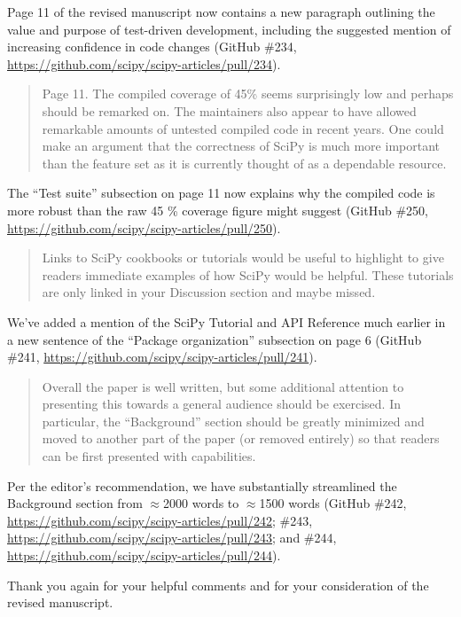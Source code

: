 \documentclass[10pt,stdletter,dateno]{newlfm}
\begin{document}
\begin{newlfm}
Page 11 of the revised manuscript now contains a new paragraph outlining the value and purpose of test-driven development, including the suggested mention of increasing confidence in code changes (GitHub \#234, \url{https://github.com/scipy/scipy-articles/pull/234}). 

\begin{quote}
Page 11. The compiled coverage of 45\% seems surprisingly low and perhaps should be remarked on. The maintainers also appear to have allowed remarkable amounts of untested compiled code in recent years. One could make an argument that the correctness of SciPy is much more important than the feature set as it is currently thought of as a dependable resource.
\end{quote}

The ``Test suite'' subsection on page 11 now explains why the compiled code is more robust than the raw 45 \% coverage figure might suggest (GitHub \#250, \url{https://github.com/scipy/scipy-articles/pull/250}). 

\begin{quote}
Links to SciPy cookbooks or tutorials would be useful to highlight to give readers immediate examples of how SciPy would be helpful. These tutorials are only linked in your Discussion section and maybe missed.
\end{quote}

We've added a mention of the SciPy Tutorial and API Reference much earlier in a new sentence of the ``Package organization'' subsection on page 6 (GitHub \#241, \url{https://github.com/scipy/scipy-articles/pull/241}). 

\begin{quote}
Overall the paper is well written, but some additional attention to presenting this towards a general audience should be exercised. In particular, the “Background” section should be greatly minimized and moved to another part of the paper (or removed entirely) so that readers can be first presented with capabilities.
\end{quote}

Per the editor's recommendation, we have substantially streamlined the Background section from $\approx$2000 words to $\approx$1500 words (GitHub \#242, \url{https://github.com/scipy/scipy-articles/pull/242}; \#243, \url{https://github.com/scipy/scipy-articles/pull/243}; and \#244, \url{https://github.com/scipy/scipy-articles/pull/244}).

Thank you again for your helpful comments and for your consideration of the revised manuscript.

\end{newlfm}
\end{document}
